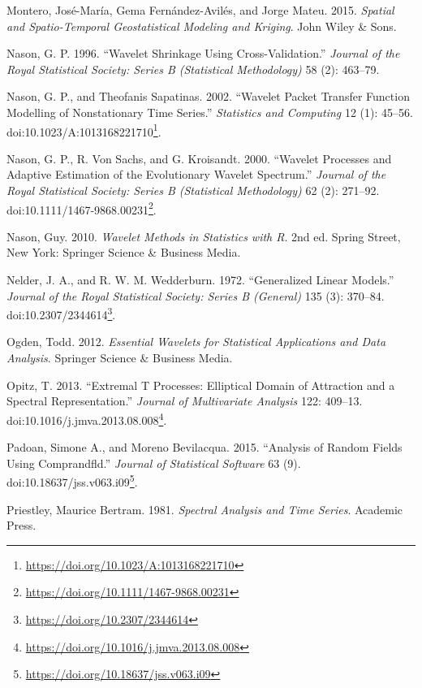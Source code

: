 \documentclass[b5paper,]{book}
\let\rmarkdownfootnote\footnote%
\def\footnote{\protect\rmarkdownfootnote}
\renewcommand{\href}[2]{#2\footnote{\url{#1}}}
\theoremstyle{definition}
\theoremstyle{definition}
\theoremstyle{definition}
\theoremstyle{remark}
\begin{document}
\hypertarget{ref-Montero2015}{}
Montero, José-María, Gema Fernández-Avilés, and Jorge Mateu. 2015.
\emph{Spatial and Spatio-Temporal Geostatistical Modeling and Kriging}.
John Wiley \& Sons.

\hypertarget{ref-Nason1996}{}
Nason, G. P. 1996. ``Wavelet Shrinkage Using Cross-Validation.''
\emph{Journal of the Royal Statistical Society: Series B (Statistical
Methodology)} 58 (2): 463--79.

\hypertarget{ref-Nason2002}{}
Nason, G. P., and Theofanis Sapatinas. 2002. ``Wavelet Packet Transfer
Function Modelling of Nonstationary Time Series.'' \emph{Statistics and
Computing} 12 (1): 45--56.
doi:\href{https://doi.org/10.1023/A:1013168221710}{10.1023/A:1013168221710}.

\hypertarget{ref-Nason2000}{}
Nason, G. P., R. Von Sachs, and G. Kroisandt. 2000. ``Wavelet Processes
and Adaptive Estimation of the Evolutionary Wavelet Spectrum.''
\emph{Journal of the Royal Statistical Society: Series B (Statistical
Methodology)} 62 (2): 271--92.
doi:\href{https://doi.org/10.1111/1467-9868.00231}{10.1111/1467-9868.00231}.

\hypertarget{ref-Nason2010}{}
Nason, Guy. 2010. \emph{Wavelet Methods in Statistics with R}. 2nd ed.
Spring Street, New York: Springer Science \& Business Media.

\hypertarget{ref-Nelder1972}{}
Nelder, J. A., and R. W. M. Wedderburn. 1972. ``Generalized Linear
Models.'' \emph{Journal of the Royal Statistical Society: Series B
(General)} 135 (3): 370--84.
doi:\href{https://doi.org/10.2307/2344614}{10.2307/2344614}.

\hypertarget{ref-Ogden2012}{}
Ogden, Todd. 2012. \emph{Essential Wavelets for Statistical Applications
and Data Analysis}. Springer Science \& Business Media.

\hypertarget{ref-Opitz2013}{}
Opitz, T. 2013. ``Extremal T Processes: Elliptical Domain of Attraction
and a Spectral Representation.'' \emph{Journal of Multivariate Analysis}
122: 409--13.
doi:\href{https://doi.org/10.1016/j.jmva.2013.08.008}{10.1016/j.jmva.2013.08.008}.

\hypertarget{ref-Padoan2015}{}
Padoan, Simone A., and Moreno Bevilacqua. 2015. ``Analysis of Random
Fields Using Comprandfld.'' \emph{Journal of Statistical Software} 63
(9).
doi:\href{https://doi.org/10.18637/jss.v063.i09}{10.18637/jss.v063.i09}.

\hypertarget{ref-Priestley1981}{}
Priestley, Maurice Bertram. 1981. \emph{Spectral Analysis and Time
Series}. Academic Press.
\end{document}
